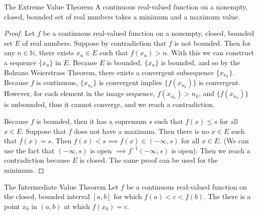 \begin{flushleft}
\begin{namedthm*}{The Extreme Value Theorem}
	A continuous real-valued function on a nonempty, closed, bounded set of real numbers takes a minimum and a maximum value.	
\end{namedthm*}
\begin{proof}
	Let $f$ be a continuous real-valued function on a nonempty, closed, bounded set $E$ of real numbers.
	Suppose by contradiction that $f$ is not bounded.
	Then for any $n \in \mathbb{N}$, there exists $x_n \in E$ such that $f(x_n) > n$.
	With this we can construct a sequence $\{x_n\}$ in $E$. Because $E$ is bounded, $\{x_n\}$ is bounded, and so by the Bolzano Weierstrass Theorem, there exists a convergent subsequence $\{x_{n_k}\}$.
	Because $f$ is continuous, $\{x_{n_k}\}$ is convergent implies $\{f(x_{n_k})\}$ is convergent.
	However, for each element in the image sequence, $f(x_{n_k})>n_k$, and $\{f(x_{n_k})\}$ is unbounded, thus it cannot converge, and we reach a contradiction.\par
	Because $f$ is bounded, then it has a supremum $s$ such that $f(x) \le s$ for all $x \in E$.
	Suppose that $f$ does not have a maximum. Then there is no $x \in E$ such that $f(x)=s$.
	Then $f(x) < s \implies f(x) \in (-\infty,s)$ for all $x \in E$.
	(We can use the fact that $(-\infty,s)$ is open $\implies f^{-1}(-\infty,s)$ is open):
	Then we reach a contradiction because $E$ is closed. The same proof can be used for the minimum.
\end{proof}

\begin{namedthm*}{The Intermediate Value Theorem}
	Let $f$ be a continuous real-valued function on the closed, bounded interval $[a,b]$ for which $f(a)<c<f(b)$.
	The there is a point $x_0$ in $(a,b)$ at which $f(x_0)=c$.
\end{namedthm*}


\end{flushleft}
